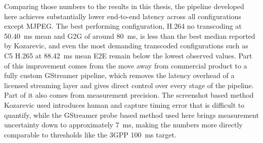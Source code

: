 Comparing those numbers to the results in this thesis, the pipeline developed here achieves substantially lower end-to-end latency across all configurations except MJPEG. The best performing configuration, H.264 no transcoding at 50.40~ms mean and G2G of around 80~ms, is less than the best median reported by Kozarevic, and even the most demanding transcoded configurations such as C5 H.265 at 88.42~ms mean E2E remain below the lowest observed values. Part of this improvement comes from the move away from commercial product to a fully custom GStreamer pipeline, which removes the latency overhead of a licensed streaming layer and gives direct control over every stage of the pipeline. Part of it also comes from measurement precision. The screenshot based method Kozarevic used introduces human and capture timing error that is difficult to quantify, while the GStreamer probe based method used here brings measurement uncertainty down to approximately 7~ms, making the numbers more directly comparable to thresholds like the 3GPP 100~ms target.
